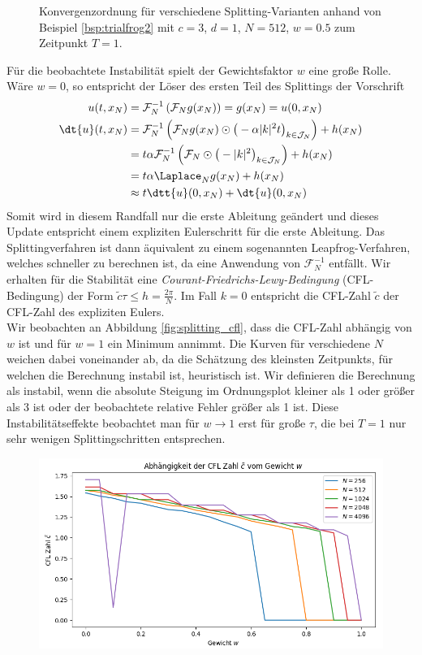 \begin{mathbsp}
\begin{figure}[!htb]
\caption{Konvergenzordnung für verschiedene Splitting-Varianten anhand von Beispiel \ref{bsp:trialfrog2} mit $c=3$, $d=1$, $N=512$, $w=0.5$ zum Zeitpunkt $T=1$.}
\label{fig:splitting_convergence}
\end{figure}
Für die beobachtete Instabilität spielt der Gewichtsfaktor $w$ eine große Rolle. Wäre $w=0$, so entspricht der Löser des ersten Teil des Splittings der Vorschrift
\begin{align*}
u(t,x_N)&=\mathcal{F}_N^{-1}\left(\mathcal{F}_Ng(x_N)\right)=g(x_N)=u(0,x_N)\\
\dt{u}(t,x_N)&=\mathcal{F}_N^{-1}\left(\mathcal{F}_Ng(x_N)\odot \big(-\alpha |k|^2t\big)_{k\in\mathcal{J}_N}\right)+h(x_N)\\
&=t \alpha \mathcal{F}_N^{-1}\left(\mathcal{F}_N\odot \big(-|k|^2\big)_{k\in\mathcal{J}_N}\right)+h(x_N)\\
&=t\alpha \Laplace_N g(x_N)+h(x_N)\\
&\approx t\dtt{u}(0,x_N)+\dt{u}(0,x_N)
\end{align*}
Somit wird in diesem Randfall nur die erste Ableitung geändert und dieses Update entspricht einem expliziten Eulerschritt für die erste Ableitung. Das Splittingverfahren ist dann äquivalent zu einem sogenannten Leapfrog-Verfahren, welches schneller zu berechnen ist, da eine Anwendung von $\mathcal{F}_N^{-1}$ entfällt. Wir erhalten für die Stabilität eine \emph{Courant-Friedrichs-Lewy-Bedingung} (CFL-Bedingung) der Form $\tilde{c}\tau\le h=\frac{2\pi}{N}$. Im Fall $k=0$ entspricht die CFL-Zahl $\tilde{c}$ der CFL-Zahl des expliziten Eulers.\\[0.3cm]
Wir beobachten an Abbildung \ref{fig:splitting_cfl}, dass die CFL-Zahl abhängig von $w$ ist und für $w=1$ ein Minimum annimmt. Die Kurven für verschiedene $N$ weichen dabei voneinander ab, da die Schätzung des kleinsten Zeitpunkts, für welchen die Berechnung instabil ist, heuristisch ist. Wir definieren die Berechnung als instabil, wenn die absolute Steigung im Ordnungsplot kleiner als 1 oder größer als 3 ist oder der beobachtete relative Fehler größer als 1 ist. Diese Instabilitätseffekte beobachtet man für $w\to 1$ erst für große $\tau$, die bei $T=1$ nur sehr wenigen Splittingschritten entsprechen.
\begin{figure}[!htb]
\includegraphics[width=\textwidth]{Figures/cfl_estimations_frog2.png}

\end{figure}
\end{mathbsp}

